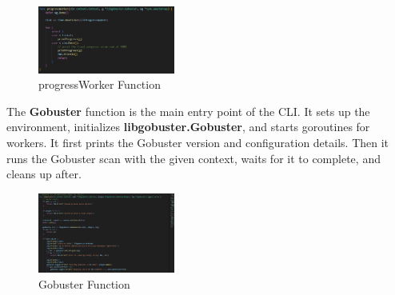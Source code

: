 \documentclass[12 pt]{article}
\begin{document}
\begin{figure}[!htbp]
    \centering
    \includegraphics[width=0.4\textwidth]{progressWorker.png}
    \caption{progressWorker Function}
    \label{fig: progressWorker}
\end{figure}
The \textbf{Gobuster} function is the main entry point of the CLI. It sets up the environment, initializes \textbf{libgobuster.Gobuster}, and starts goroutines for workers. It first prints the Gobuster version and configuration details. Then it runs the Gobuster scan with the given context, waits for it to complete, and cleans up after.
\begin{figure}[!htbp]
    \centering
    \includegraphics[width=0.4\textwidth]{Gobuster_cli.png}
    \caption{Gobuster Function}
    \label{fig: Gobuster cli}
\end{figure}
\end{document}
